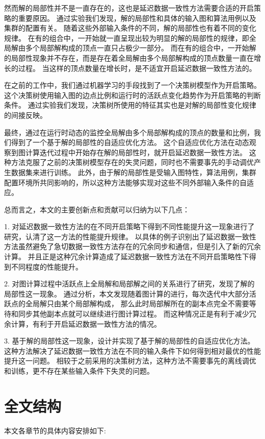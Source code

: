 然而解的局部性并不是一直存在的，这也是延迟数据一致性方法需要合适的开启策略的重要原因。
通过实验我们发现，解的局部性和具体的输入图和算法用例以及集群的配置有关。
随着这些外部输入条件的不同，解的局部性也有着不同的变化规律。
在有的组合中，一开始就一直呈现出较为明显的解的局部性的规律，即全局解由多个局部解构成的顶点一直只占极少一部分。
而在有的组合中，一开始解的局部性现象并不存在，而是存在着全局解由多个局部解构成的顶点数量一直在增长的过程。
当这样的顶点数量在增长时，是不适宜开启延迟数据一致性方法的。

在之前的工作中，我们通过机器学习的手段找到了一个决策树模型作为开启策略。
这个决策树使用输入图的边点比例和运行时的活跃点变化趋势作为开启策略的判断条件。
通过实验我们发现，决策树所使用的特征其实也是对解的局部性变化规律的间接反映。

最终，通过在运行时动态的监控全局解由多个局部解构成的顶点的数量和比例，我们得到了一个基于解的局部性的自适应优化方法。
这个自适应优化方法在动态观察到图计算迭代过程中开始存在解的局部性时，就开启延迟数据一致性方法。
这种方法克服了之前的决策树模型存在的失灵问题，同时也不需要事先的手动调优产生数据集来进行训练。
此外，由于解的局部性是受输入图特性，算法用例，集群配置环境所共同影响的，所以这种方法能够实现对这些不同外部输入条件的自适应。

总而言之，本文的主要创新点和贡献可以归纳为以下几点：

1. 对延迟数据一致性方法的在不同开启策略下得到不同性能提升这一现象进行了研究，认清了这一方法的性能提升规律。
以具体的例子识别出了延迟数据一致性方法虽然避免了急切数据一致性方法存在的冗余同步和通信，但是引入了新的冗余计算。
并且正是这种冗余计算造成了延迟数据一致性方法在不同开启策略性下得到不同程度的性能提升。

2. 对图计算过程中活跃点上全局解和局部解之间的关系进行了研究，发现了解的局部性这一现象。
通过分析，本文发现随着图计算的进行，每次迭代中大部分活跃点的全局解只由某个局部解构成，
那么此时局部解所在的副本点完全不需要等待和同步其他副本点就可以继续进行图计算过程。
而这种情况正是有利于减少冗余计算，有利于开启延迟数据一致性方法的情况。

3. 基于解的局部性这一现象，设计并实现了基于解的局部性的自适应优化方法。
这种方法解决了延迟数据一致性方法在不同的输入条件下如何得到相对最优的性能提升这一问题。
相较于之前采用的决策树方法，这种方法不需要事先的离线调优和训练，更不存在某些输入条件下失灵的问题。




\section{全文结构}
本文各章节的具体内容安排如下:


